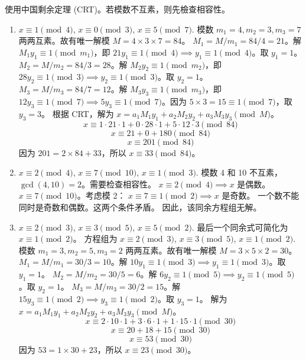 \begin{enumerate}
\begin{solution}
        使用中国剩余定理 (CRT)。若模数不互素，则先檢查相容性。
        \begin{enumerate}
            \item $x \equiv 1 \pmod 4$, $x \equiv 0 \pmod 3$, $x \equiv 5 \pmod 7$.
            模数 $m_1=4, m_2=3, m_3=7$ 两两互素。故有唯一解模 $M = 4 \times 3 \times 7 = 84$。
            $M_1 = M/m_1 = 84/4 = 21$。解 $M_1 y_1 \equiv 1 \pmod{m_1}$，即 $21y_1 \equiv 1 \pmod 4 \implies y_1 \equiv 1 \pmod 4$。取 $y_1=1$。
            $M_2 = M/m_2 = 84/3 = 28$。解 $M_2 y_2 \equiv 1 \pmod{m_2}$，即 $28y_2 \equiv 1 \pmod 3 \implies y_2 \equiv 1 \pmod 3$。取 $y_2=1$。
            $M_3 = M/m_3 = 84/7 = 12$。解 $M_3 y_3 \equiv 1 \pmod{m_3}$，即 $12y_3 \equiv 1 \pmod 7 \implies 5y_3 \equiv 1 \pmod 7$。因为 $5 \times 3 = 15 \equiv 1 \pmod 7$，取 $y_3=3$。
            根据 CRT，解为 $x = a_1 M_1 y_1 + a_2 M_2 y_2 + a_3 M_3 y_3 \pmod M$。
            \[ x \equiv 1 \cdot 21 \cdot 1 + 0 \cdot 28 \cdot 1 + 5 \cdot 12 \cdot 3 \pmod{84} \]
            \[ x \equiv 21 + 0 + 180 \pmod{84} \]
            \[ x \equiv 201 \pmod{84} \]
            因为 $201 = 2 \times 84 + 33$，所以 $x \equiv 33 \pmod{84}$。
            \item $x \equiv 2 \pmod 4$, $x \equiv 7 \pmod{10}$, $x \equiv 1 \pmod 3$.
            模数 4 和 10 不互素，$\gcd(4, 10) = 2$。需要检查相容性。
            $x \equiv 2 \pmod 4 \implies x$ 是偶数。
            $x \equiv 7 \pmod{10}$。考虑模 2： $x \equiv 7 \equiv 1 \pmod 2 \implies x$ 是奇数。
            一个数不能同时是奇数和偶数。这两个条件矛盾。
            因此，该同余方程组无解。
            \item $x \equiv 2 \pmod 3$, $x \equiv 3 \pmod 5$, $x \equiv 5 \pmod 2$.
            最后一个同余式可简化为 $x \equiv 1 \pmod 2$。
            方程组为 $x \equiv 2 \pmod 3$, $x \equiv 3 \pmod 5$, $x \equiv 1 \pmod 2$.
            模数 $m_1=3, m_2=5, m_3=2$ 两两互素。故有唯一解模 $M = 3 \times 5 \times 2 = 30$。
            $M_1 = M/m_1 = 30/3 = 10$。解 $10y_1 \equiv 1 \pmod 3 \implies y_1 \equiv 1 \pmod 3$。取 $y_1=1$。
            $M_2 = M/m_2 = 30/5 = 6$。解 $6y_2 \equiv 1 \pmod 5 \implies y_2 \equiv 1 \pmod 5$。取 $y_2=1$。
            $M_3 = M/m_3 = 30/2 = 15$。解 $15y_3 \equiv 1 \pmod 2 \implies y_3 \equiv 1 \pmod 2$。取 $y_3=1$。
            解为 $x = a_1 M_1 y_1 + a_2 M_2 y_2 + a_3 M_3 y_3 \pmod M$。
            \[ x \equiv 2 \cdot 10 \cdot 1 + 3 \cdot 6 \cdot 1 + 1 \cdot 15 \cdot 1 \pmod{30} \]
            \[ x \equiv 20 + 18 + 15 \pmod{30} \]
            \[ x \equiv 53 \pmod{30} \]
            因为 $53 = 1 \times 30 + 23$，所以 $x \equiv 23 \pmod{30}$。

\end{enumerate}
\end{solution}
\end{enumerate}
